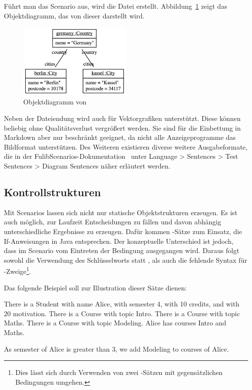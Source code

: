 Führt man das Scenario aus, wird die Datei  erstellt.
Abbildung~\ref{fig:germany.png} zeigt das Objektdiagramm, das von dieser darstellt wird.

\begin{figure}
    \centering
    \includegraphics[width=0.5\textwidth]{chapter/fulib-scenarios/img/germany.png}
    \caption{Objektdiagramm von }
    \label{fig:germany.png}
\end{figure}

Neben der Dateiendung  wird auch  für Vektorgrafiken unterstützt.
Diese können beliebig ohne Qualitätsverlust vergrößert werden.
Sie sind für die Einbettung in Markdown aber nur beschränkt geeignet, da nicht alle Anzeigeprogramme das Bildformat unterstützen.
Des Weiteren existieren diverse weitere Ausgabeformate, die in der FulibScenarios-Dokumentation~\cite{documentation} unter Language > Sentences > Test Sentences > Diagram Sentences näher erläutert werden.

\subsection{Kontrollstrukturen}\label{subsec:control-structures}

Mit Scenarios lassen sich nicht nur statische Objektstrukturen erzeugen.
Es ist auch möglich, zur Laufzeit Entscheidungen zu fällen und davon abhängig unterschiedliche Ergebnisse zu erzeugen.
Dafür kommen -Sätze zum Einsatz, die If-Anweisungen in Java entsprechen.
Der konzeptuelle Unterschied ist jedoch, dass im Scenario vom Eintreten der Bedingung ausgegangen wird.
Daraus folgt sowohl die Verwendung des Schlüsselworts  statt , als auch die fehlende Syntax für -Zweige\footnote{
Dies lässt sich durch Verwenden von zwei -Sätzen mit gegensätzlichen Bedingungen umgehen.
}.

Das folgende Beispiel soll zur Illustration dieser Sätze dienen:

\begin{codeblock}
    There is a Student with name Alice, with semester 4, with 10 credits, and with 20 motivation.
    There is a Course with topic Intro.
    There is a Course with topic Maths.
    There is a Course with topic Modeling.
    Alice has courses Intro and Maths.

    As semester of Alice is greater than 3, we add Modeling to courses of Alice.
\end{codeblock}

